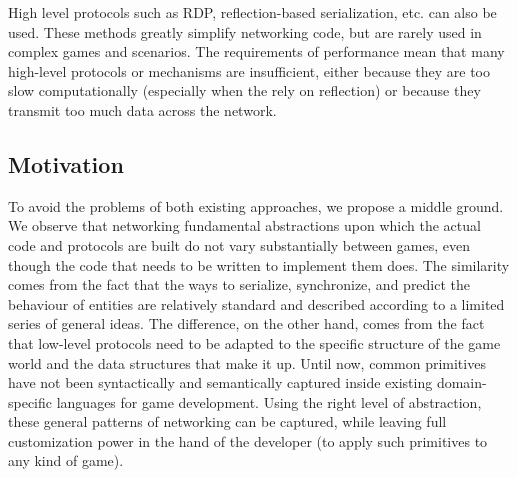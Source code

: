 High level protocols such as RDP, reflection-based serialization, etc. can also be used. These methods greatly simplify  networking code, but are rarely used in complex games and scenarios. The requirements of performance mean that many high-level protocols or mechanisms are insufficient, either because they are too slow computationally (especially when the rely on reflection) or because they transmit too much data across the network.

\subsection*{Motivation}

To avoid the problems of both existing approaches, we propose a middle ground. We observe that networking fundamental abstractions upon which the actual code and protocols are built do not vary substantially between games, even though the code that needs to be written to implement them does. The similarity comes from the fact that the ways to serialize, synchronize, and predict the behaviour of entities are relatively standard and described according to a limited series of general ideas. The difference, on the other hand, comes from the fact that low-level protocols need to be adapted to the specific structure of the game world and the data structures that make it up. Until now, common primitives have not been syntactically and semantically captured inside existing domain-specific languages for game development. Using the right level of abstraction, these general patterns of networking can be captured, while leaving full customization power in the hand of the developer (to apply such primitives to any kind of game).

